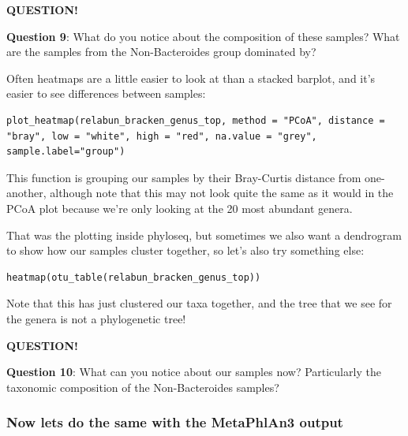 \documentclass[
]{book}
\newenvironment{bluebox}{
  \definecolor{shadecolor}{RGB}{172, 210, 237}
  \color{white}
  \begin{shaded}}
 {\end{shaded}}
\begin{document}
\begin{bluebox}

\begin{center}
\textbf{QUESTION!}

\end{center}

\textbf{Question 9}: What do you notice about the composition of these samples? What are the samples from the Non-Bacteroides group dominated by?

\end{bluebox}

Often heatmaps are a little easier to look at than a stacked barplot, and it's easier to see differences between samples:

\begin{verbatim}
plot_heatmap(relabun_bracken_genus_top, method = "PCoA", distance = "bray", low = "white", high = "red", na.value = "grey", sample.label="group")
\end{verbatim}

This function is grouping our samples by their Bray-Curtis distance from one-another, although note that this may not look quite the same as it would in the PCoA plot because we're only looking at the 20 most abundant genera.

That was the plotting inside phyloseq, but sometimes we also want a dendrogram to show how our samples cluster together, so let's also try something else:

\begin{verbatim}
heatmap(otu_table(relabun_bracken_genus_top))
\end{verbatim}

Note that this has just clustered our taxa together, and the tree that we see for the genera is not a phylogenetic tree!

\begin{bluebox}

\begin{center}
\textbf{QUESTION!}

\end{center}

\textbf{Question 10}: What can you notice about our samples now? Particularly the taxonomic composition of the Non-Bacteroides samples?

\end{bluebox}

\subsubsection{Now lets do the same with the MetaPhlAn3 output}\label{now-lets-do-the-same-with-the-metaphlan3-output}
\end{document}
